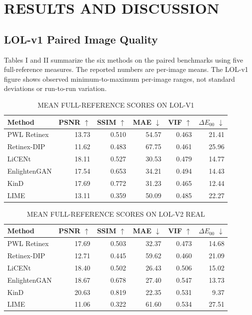 \documentclass[conference]{IEEEtran}
\begin{document}
\section{RESULTS AND DISCUSSION}

\subsection{LOL-v1 Paired Image Quality}

Tables I and II summarize the six methods on the paired benchmarks using five full-reference measures. The reported numbers are per-image means. The LOL-v1 figure shows observed minimum-to-maximum per-image ranges, not standard deviations or run-to-run variation.

\begin{table}[!t]
\centering
\caption{MEAN FULL-REFERENCE SCORES ON LOL-V1}
\small
\setlength{\tabcolsep}{5pt}
\begin{tabular}{lrrrrr}
\toprule
Method & PSNR $\uparrow$ & SSIM $\uparrow$ & MAE $\downarrow$ & VIF $\uparrow$ & $\Delta E_{00}$ $\downarrow$ \\
\midrule
PWL Retinex & 13.73 & 0.510 & 54.57 & 0.463 & 21.41 \\
Retinex-DIP & 11.62 & 0.483 & 67.75 & 0.461 & 25.96 \\
LiCENt & 18.11 & 0.527 & 30.53 & 0.479 & 14.77 \\
EnlightenGAN & 17.54 & 0.653 & 34.21 & 0.494 & 14.43 \\
KinD & 17.69 & 0.772 & 31.23 & 0.465 & 12.44 \\
LIME & 13.11 & 0.359 & 50.09 & 0.485 & 22.27 \\
\bottomrule
\end{tabular}
\end{table}

\begin{table}[!t]
\centering
\caption{MEAN FULL-REFERENCE SCORES ON LOL-V2 REAL}
\small
\setlength{\tabcolsep}{5pt}
\begin{tabular}{lrrrrr}
\toprule
Method & PSNR $\uparrow$ & SSIM $\uparrow$ & MAE $\downarrow$ & VIF $\uparrow$ & $\Delta E_{00}$ $\downarrow$ \\
\midrule
PWL Retinex & 17.69 & 0.503 & 32.37 & 0.473 & 14.68 \\
Retinex-DIP & 12.71 & 0.445 & 59.62 & 0.460 & 21.09 \\
LiCENt & 18.40 & 0.502 & 26.43 & 0.506 & 15.02 \\
EnlightenGAN & 18.67 & 0.678 & 27.40 & 0.547 & 13.73 \\
KinD & 20.63 & 0.819 & 22.35 & 0.531 & 9.37 \\
LIME & 11.06 & 0.322 & 61.60 & 0.534 & 27.51 \\
\bottomrule
\end{tabular}
\end{table}
\end{document}
